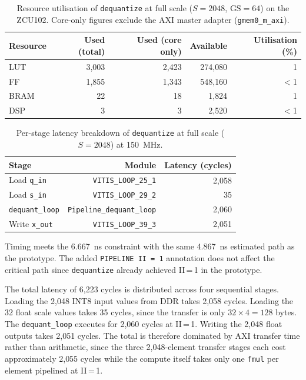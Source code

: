 \begin{table}[H]
  \centering
  \begin{tabular}{lrrrr}
    \toprule
    Resource & Used (total) & Used (core only) & Available & Utilisation (\%) \\
    \midrule
    LUT  & 3{,}003 & 2{,}423 & 274{,}080 & 1 \\
    FF   & 1{,}855 & 1{,}343 & 548{,}160 & $<$1 \\
    BRAM &      22 &      18 &   1{,}824 & 1 \\
    DSP  &       3 &       3 &   2{,}520 & $<$1 \\
    \bottomrule
  \end{tabular}
  \caption{Resource utilisation of \texttt{dequantize} at full scale
           ($S = 2048$, $\text{GS} = 64$) on the ZCU102. Core-only
           figures exclude the AXI master adapter (\texttt{gmem0\_m\_axi}).}
  \label{tab:dequantize_u3_resources}
\end{table}

\begin{table}[H]
  \centering
  \begin{tabular}{lrr}
    \toprule
    Stage & Module & Latency (cycles) \\
    \midrule
    Load \texttt{q\_in}    & \texttt{VITIS\_LOOP\_25\_1}       & 2{,}058 \\
    Load \texttt{s\_in}    & \texttt{VITIS\_LOOP\_29\_2}       &      35 \\
    \texttt{dequant\_loop} & \texttt{Pipeline\_dequant\_loop}  & 2{,}060 \\
    Write \texttt{x\_out}  & \texttt{VITIS\_LOOP\_39\_3}       & 2{,}051 \\
    \bottomrule
  \end{tabular}
  \caption{Per-stage latency breakdown of \texttt{dequantize} at full scale
           ($S = 2048$) at \SI{150}{\mega\hertz}.}
  \label{tab:dequantize_u3_latency}
\end{table}

Timing meets the \SI{6.667}{\nano\second} constraint with the same
\SI{4.867}{\nano\second} estimated path as the prototype. The added
\texttt{PIPELINE II\,=\,1} annotation does not affect the critical path
since \texttt{dequantize} already achieved II\,=\,1 in the prototype.

The total latency of 6{,}223 cycles is distributed across four sequential
stages. Loading the 2{,}048 INT8 input values from DDR takes 2{,}058
cycles. Loading the 32 float scale values takes 35 cycles, since the
transfer is only $32 \times 4 = 128$ bytes. The \texttt{dequant\_loop}
executes for 2{,}060 cycles at II\,=\,1. Writing the 2{,}048 float
outputs takes 2{,}051 cycles. The total is therefore dominated by AXI
transfer time rather than arithmetic, since the three
2{,}048-element transfer stages each cost approximately 2{,}055 cycles
while the compute itself takes only one \texttt{fmul} per element pipelined
at II\,=\,1.

